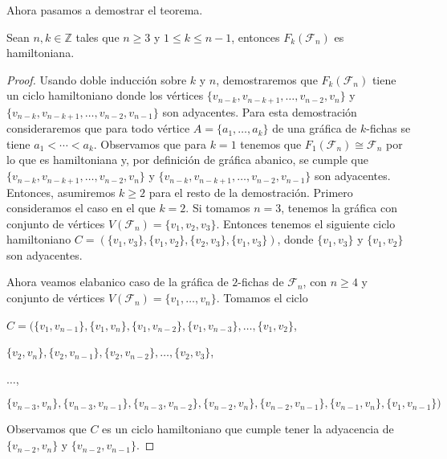 Ahora pasamos a demostrar el teorema.
    
\begin{teorema}
\label{teo:hamilt-SFan}
    Sean $n,k \in \mathbb{Z}$ tales que $n \geq 3$ y $1 \leq k \leq n-1$,
    entonces $F_k(\mathcal{F}_n)$ es hamiltoniana.
\end{teorema}
    
\begin{proof}
    Usando doble inducci\'on sobre $k$ y $n$, demostraremos que
    $F_k(\mathcal{F}_n)$ tiene un ciclo hamiltoniano donde los v\'ertices
    $\{v_{n-k}, v_{n-k+1}, \dots, v_{n-2}, v_n\}$ y $\{v_{n-k}, v_{n-k+1},
    \dots, v_{n-2}, v_{n-1}\}$ son adyacentes. Para esta demostraci\'on
    consideraremos que para todo v\'ertice $A = \{a_1, \dots, a_k\}$ de una
    gr\'afica de $k$-fichas se tiene $a_1 < \cdots < a_k$. Observamos que para
    $k =1$ tenemos que $F_1(\mathcal{F}_n) \cong \mathcal{F}_n$ por lo que es
    hamiltoniana y, por definici\'on de gr\'afica abanico, se cumple que
    $\{v_{n-k}, v_{n-k+1}, \dots, v_{n-2}, v_n\}$ y $\{v_{n-k}, v_{n-k+1},
    \dots, v_{n-2}, v_{n-1}\}$ son adyacentes. Entonces, asumiremos $k \geq 2$
    para el resto de la demostraci\'on. Primero consideramos el caso en el que
    $k =2$. Si tomamos $n = 3$, tenemos la gr\'afica con conjunto de v\'ertices
    $V(\mathcal{F}_n)=\{v_1, v_2, v_3\}$. Entonces tenemos el siguiente ciclo
    hamiltoniano $C= (\{v_1,v_3\},\{v_1,v_2\},\{v_2,v_3\}, \{v_1,v_3\})$, donde
    $\{v_1, v_3\}$ y $\{v_1, v_2\}$ son adyacentes. 
            
    Ahora veamos elabanico caso de la gr\'afica de $2$-fichas de
    $\mathcal{F}_n$, con $n \geq 4$ y conjunto de v\'ertices
    $V(\mathcal{F}_n)=\{v_1,\dots, v_n\}$. Tomamos el ciclo
    
    $C = (\{v_1, v_{n-1}\},\{v_1, v_n\},\{v_1, v_{n-2}\}, \{v_1, v_{n-3}\},
    \dots, \{v_1, v_2\}$,
            
    $\{v_2, v_n\}, \{v_2, v_{n-1}\}, \{v_2, v_{n-2}\}, \dots, \{v_2,v_3\}$,
    
    $ \dots$,
    
    $\{v_{n-3},v_n\}, \{v_{n-3}, v_{n-1}\},\{v_{n-3},v_{n-2}\}, \{v_{n-2},
    v_n\},\{v_{n-2}, v_{n-1}\}, \{v_{n-1}, v_n\}, \{v_1, v_{n-1}\})$
    
    Observamos que $C$ es un ciclo hamiltoniano que cumple tener la adyacencia
    de  $\{v_{n-2}, v_n\}$ y $\{v_{n-2}, v_{n-1}\}$. 
    

\end{proof}
